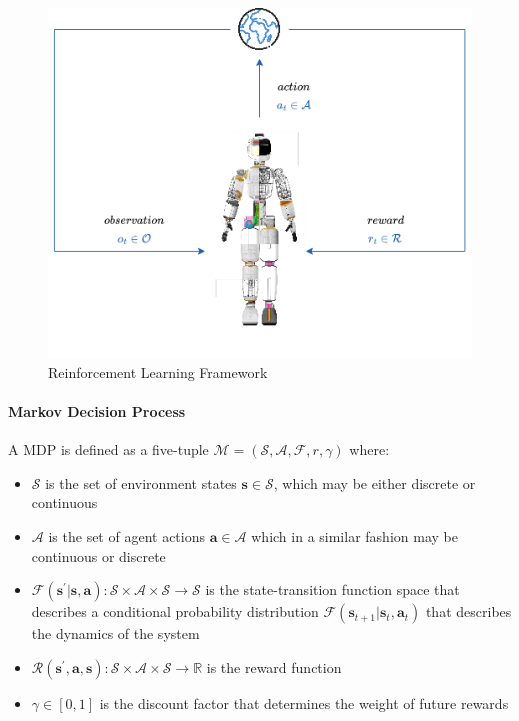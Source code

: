 \begin{figure}
    \centering
    \caption{Reinforcement Learning Framework}
    \label{fig:rlframework}
    \includegraphics[width=.7\textwidth]{Images/rl_ergocub.png}
\end{figure}

\paragraph{Markov Decision Process} A \ac{MDP} is defined as a five-tuple $\mathcal{M} = (\mathcal{S}, \mathcal{A}, \mathcal{F}, r, \gamma)$ where:

\begin{itemize}
    \item $\mathcal{S}$ is the set of environment states $\mathbf{s} \in \mathcal{S}$, which may be either discrete or continuous
    \item $\mathcal{A}$ is the set of agent actions $\mathbf{a} \in \mathcal{A}$ which in a similar fashion may be continuous or discrete
    \item $\mathcal{F} (\mathbf{s}^\prime | \mathbf{s}, \mathbf{a}): \mathcal{S} \times \mathcal{A} \times \mathcal{S} \rightarrow \mathcal{S}$ is the state-transition function space that describes a conditional probability distribution $\mathcal{F}(\mathbf{s} _{t+1}|\mathbf{s}_t, \mathbf{a} _t)$ that describes the dynamics of the system
    \item $\mathcal{R} (\mathbf{s}^\prime, \mathbf{a}, \mathbf{s}): \mathcal{S} \times \mathcal{A} \times \mathcal{S} \rightarrow \mathbb{R}$ is the reward function
    \item $\gamma \in [0,1]$ is the discount factor that determines the weight of future rewards
\end{itemize}


